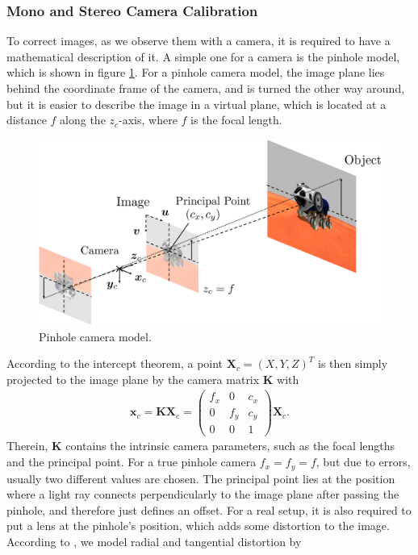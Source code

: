 \subsubsection{Mono and Stereo Camera Calibration}
To correct images, as we observe them with a camera, it is required to have a mathematical description of it. A simple one for a camera is the pinhole model, which is shown in figure \ref{fig::224_pin_hole_camera}. For a pinhole camera model, the image plane lies behind the coordinate frame of the camera, and is turned the other way around, but it is easier to describe the image in a virtual plane, which is located at a distance $f$ along the $z_c$-axis, where $f$ is the focal length.
\begin{figure}[h!]
	\centering
	\includegraphics[scale=.28]{chapters/02_background/img/pin_hole_camera.png}
	\caption{Pinhole camera model.}
	\label{fig::224_pin_hole_camera}
\end{figure}
According to the intercept theorem, a point $\bm{X}_c = (X,Y,Z)^T$ is then simply projected to the image plane by the camera matrix $\bm{K}$ with
\begin{align}
	\bm{x}_c = \bm{K}\bm{X}_c = \begin{pmatrix}
	f_x & 0   & c_x \\
	0   & f_y & c_y \\
	0   & 0   & 1
	\end{pmatrix}\bm{X}_c.
	\label{eq::224_focal_intrinsics}
\end{align}
Therein, $\bm{K}$ contains the intrinsic camera parameters, such as the focal lengths and the principal point. For a true pinhole camera $f_x = f_y =f$, but due to errors, usually two different values are chosen. The principal point lies at the position where a light ray connects perpendicularly to the image plane after passing the pinhole, and therefore just defines an offset. For a real setup, it is also required to put a lens at the pinhole's position, which adds some distortion to the image. According to \cite{duane1971close}, we model radial and tangential distortion by
